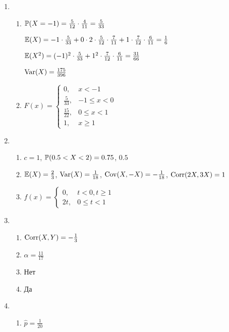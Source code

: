 \begin{enumerate}
\item
\begin{enumerate}
\item $\P(X=-1) = \frac{5}{12}\cdot\frac{4}{11} = \frac{5}{33}$

$\E(X) = -1 \cdot \frac{5}{33} + 0 \cdot 2 \cdot \frac{5}{12}\cdot\frac{7}{11} + 1 \cdot \frac{7}{12}\cdot\frac{6}{11} = \frac{1}{6}$

$\E(X^2) = (-1)^2 \cdot \frac{5}{33} + 1^2 \cdot \frac{7}{12}\cdot\frac{6}{11} = \frac{31}{66}$

$\Var(X) = \frac{175}{396}$
\item $F(x) = \begin{cases}
0, & x < -1 \\
\frac{5}{33}, & -1 \leq x < 0 \\
\frac{15}{22}, & 0 \leq x < 1 \\
1, & x \geq 1
\end{cases}$
\end{enumerate}
\item
\begin{enumerate}
\item $c=1$, $\P(0.5<X<2) = 0.75$, $0.5$
\item $\E(X) = \frac{2}{3}$, $\Var(X) = \frac{1}{18}$, $\Cov(X,-X) = - \frac{1}{18}$,
$\Corr(2X,3X) = 1$
\item $f(x) = \begin{cases}
0, & t < 0, t \geq 1 \\
2t, & 0 \leq t < 1
\end{cases}$
\end{enumerate}
\item
\begin{enumerate}
\item $\Corr(X,Y)=-\frac{1}{3}$
\item $\alpha=\frac{11}{17}$
\item Нет
\item Да
\end{enumerate}
\item
\begin{enumerate}
\item $\hat{p} = \frac{1}{20}$


\end{enumerate}
\end{enumerate}
